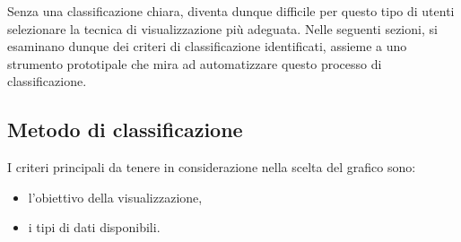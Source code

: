 Senza una classificazione chiara, diventa dunque difficile per questo tipo di utenti selezionare la tecnica di visualizzazione più adeguata.
Nelle seguenti sezioni, si esaminano dunque dei criteri di classificazione identificati, assieme a uno strumento prototipale che mira ad 
automatizzare questo processo di classificazione.

\subsection{Metodo di classificazione}
I criteri principali da tenere in considerazione nella scelta del grafico sono:
\begin{itemize}
    \item l'obiettivo della visualizzazione,
    \item i tipi di dati disponibili.
\end{itemize}

